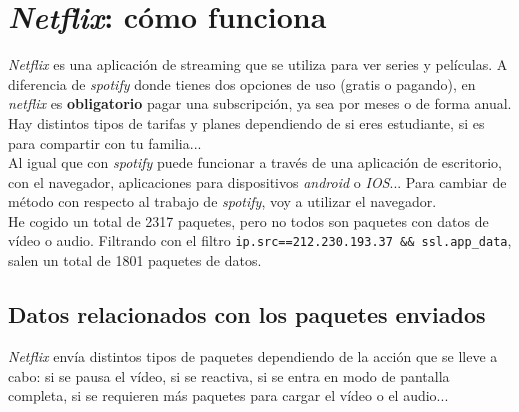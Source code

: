 \documentclass[11pt,a4paper]{article}
\begin{document}

\newpage

\section*{\textit{Netflix}: cómo funciona}

\textit{Netflix} es una aplicación de streaming que se utiliza para ver series y películas. A diferencia de \textit{spotify} donde tienes dos opciones de uso (gratis o pagando), en \textit{netflix} es \textbf{obligatorio} pagar una subscripción, ya sea por meses o de forma anual. Hay distintos tipos de tarifas y planes dependiendo de si eres estudiante, si es para compartir con tu familia...\\

Al igual que con \textit{spotify} puede funcionar a través de una aplicación de escritorio, con el navegador, aplicaciones para dispositivos \textit{android} o \textit{IOS}... Para cambiar de método con respecto al trabajo de \textit{spotify}, voy a utilizar el navegador.\\

He cogido un total de 2317 paquetes, pero no todos son paquetes con datos de vídeo o audio. Filtrando con el filtro \color{deepgreen}\texttt{ip.src==212.230.193.37 \&\& ssl.app\_data}\color{black}, salen un total de 1801 paquetes de datos.


\subsection*{Datos relacionados con los paquetes enviados}

\textit{Netflix} envía distintos tipos de paquetes dependiendo de la acción que se lleve a cabo: si se pausa el vídeo, si se reactiva, si se entra en modo de pantalla completa, si se requieren más paquetes para cargar el vídeo o el audio...
\end{document}
